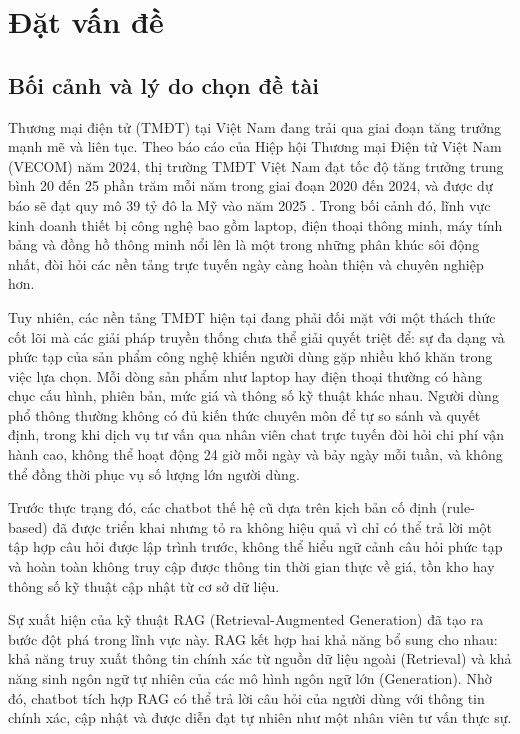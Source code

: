 \chapter{Đặt vấn đề}

\section{Bối cảnh và lý do chọn đề tài}

Thương mại điện tử (TMĐT) tại Việt Nam đang trải qua giai đoạn tăng trưởng mạnh mẽ và liên tục. Theo báo cáo của Hiệp hội Thương mại Điện tử Việt Nam (VECOM) năm 2024, thị trường TMĐT Việt Nam đạt tốc độ tăng trưởng trung bình 20 đến 25 phần trăm mỗi năm trong giai đoạn 2020 đến 2024, và được dự báo sẽ đạt quy mô 39 tỷ đô la Mỹ vào năm 2025 \cite{vecom2024}. Trong bối cảnh đó, lĩnh vực kinh doanh thiết bị công nghệ bao gồm laptop, điện thoại thông minh, máy tính bảng và đồng hồ thông minh nổi lên là một trong những phân khúc sôi động nhất, đòi hỏi các nền tảng trực tuyến ngày càng hoàn thiện và chuyên nghiệp hơn.

Tuy nhiên, các nền tảng TMĐT hiện tại đang phải đối mặt với một thách thức cốt lõi mà các giải pháp truyền thống chưa thể giải quyết triệt để: sự đa dạng và phức tạp của sản phẩm công nghệ khiến người dùng gặp nhiều khó khăn trong việc lựa chọn. Mỗi dòng sản phẩm như laptop hay điện thoại thường có hàng chục cấu hình, phiên bản, mức giá và thông số kỹ thuật khác nhau. Người dùng phổ thông thường không có đủ kiến thức chuyên môn để tự so sánh và quyết định, trong khi dịch vụ tư vấn qua nhân viên chat trực tuyến đòi hỏi chi phí vận hành cao, không thể hoạt động 24 giờ mỗi ngày và bảy ngày mỗi tuần, và không thể đồng thời phục vụ số lượng lớn người dùng.

Trước thực trạng đó, các chatbot thế hệ cũ dựa trên kịch bản cố định (rule-based) đã được triển khai nhưng tỏ ra không hiệu quả vì chỉ có thể trả lời một tập hợp câu hỏi được lập trình trước, không thể hiểu ngữ cảnh câu hỏi phức tạp và hoàn toàn không truy cập được thông tin thời gian thực về giá, tồn kho hay thông số kỹ thuật cập nhật từ cơ sở dữ liệu.

Sự xuất hiện của kỹ thuật RAG (Retrieval-Augmented Generation) \cite{lewis2020rag} đã tạo ra bước đột phá trong lĩnh vực này. RAG kết hợp hai khả năng bổ sung cho nhau: khả năng truy xuất thông tin chính xác từ nguồn dữ liệu ngoài (Retrieval) và khả năng sinh ngôn ngữ tự nhiên của các mô hình ngôn ngữ lớn (Generation). Nhờ đó, chatbot tích hợp RAG có thể trả lời câu hỏi của người dùng với thông tin chính xác, cập nhật và được diễn đạt tự nhiên như một nhân viên tư vấn thực sự.

